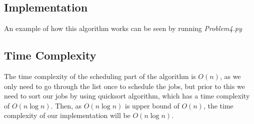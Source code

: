 \documentclass{article}
\begin{document}
\subsection*{Implementation}

An example of how this algorithm works can be seen by running \textit{Problem4.py}

\subsection*{Time Complexity}

The time complexity of the scheduling part of the algorithm is $O(n)$, as we only need to go through the list once to schedule the jobs, but prior to this we need to sort our jobs by using quicksort algorithm, which has a time complexity of $O(n\log n)$. Then, as $O(n\log n)$ is upper bound of $O(n)$, the time complexity of our implementation will be $O(n\log n)$.
\end{document}
